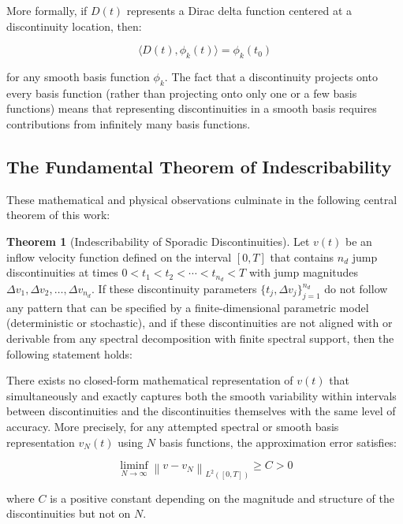 ﻿\documentclass[a4paper,11pt]{article}
\theoremstyle{definition}
\newtheorem{theorem}{Theorem}
\begin{document}
More formally, if $D(t)$ represents a Dirac delta function centered at a discontinuity location, then:

\begin{equation}
\langle D(t), \phi_k(t) \rangle = \phi_k(t_0)
\end{equation}

for any smooth basis function $\phi_k$. The fact that a discontinuity projects onto every basis function (rather than projecting onto only one or a few basis functions) means that representing discontinuities in a smooth basis requires contributions from infinitely many basis functions.

\subsection{The Fundamental Theorem of Indescribability}

These mathematical and physical observations culminate in the following central theorem of this work:

\begin{theorem}[Indescribability of Sporadic Discontinuities]
Let $v(t)$ be an inflow velocity function defined on the interval $[0, T]$ that contains $n_d$ jump discontinuities at times $0 < t_1 < t_2 < \cdots < t_{n_d} < T$ with jump magnitudes $\Delta v_1, \Delta v_2, \ldots, \Delta v_{n_d}$. If these discontinuity parameters $\{t_j, \Delta v_j\}_{j=1}^{n_d}$ do not follow any pattern that can be specified by a finite-dimensional parametric model (deterministic or stochastic), and if these discontinuities are not aligned with or derivable from any spectral decomposition with finite spectral support, then the following statement holds:

There exists no closed-form mathematical representation of $v(t)$ that simultaneously and exactly captures both the smooth variability within intervals between discontinuities and the discontinuities themselves with the same level of accuracy. More precisely, for any attempted spectral or smooth basis representation $v_N(t)$ using $N$ basis functions, the approximation error satisfies:

\begin{equation}
\liminf_{N \to \infty} \left\| v - v_N \right\|_{L^2([0,T])} \geq C > 0
\end{equation}

where $C$ is a positive constant depending on the magnitude and structure of the discontinuities but not on $N$.
\end{theorem}
\end{document}
